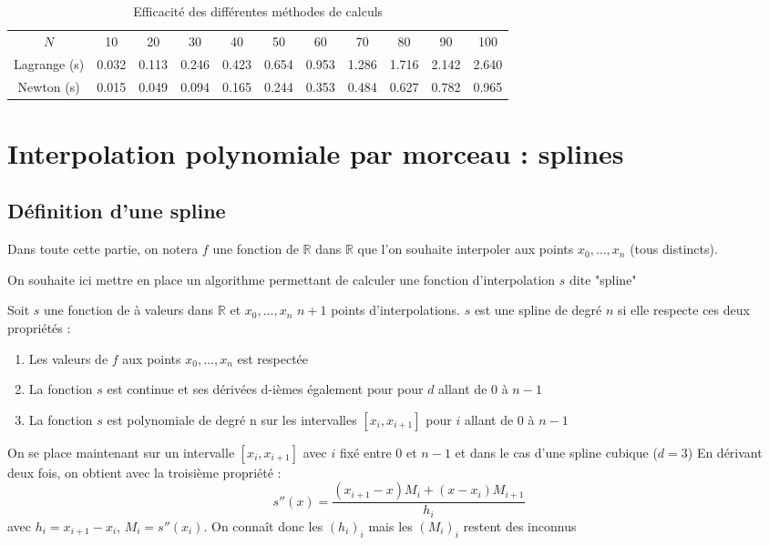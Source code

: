 \begin{table}[h]
  \centering
\begin{tabular}{ccccccccccc}
    $N$ & 10 & 20 & 30 & 40 & 50 & 60 & 70 & 80 & 90 & 100 \\
   Lagrange (s) & 0.032 & 0.113 & 0.246 & 0.423 & 0.654 & 0.953 & 1.286 & 1.716 & 2.142 & 2.640 \\
   Newton (s) & 0.015 & 0.049 & 0.094 & 0.165 & 0.244 & 0.353 & 0.484 & 0.627 & 0.782 & 0.965 \\
\end{tabular}
  \caption{Efficacité des différentes méthodes de calculs}
  \label{table:compNewtonLagrange}
\end{table}



\chapter{Interpolation polynomiale par morceau : splines}

\section{Définition d'une spline }

Dans toute cette partie, on notera $f$ une fonction de $\mathbb{R}$ 
dans $\mathbb{R}$ que l'on souhaite interpoler aux points 
$x_0, \dots, x_n$ (tous distincts).

On souhaite ici mettre en place un algorithme 
permettant de calculer une fonction d'interpolation $s$ dite "spline"

\begin{definition}
Soit $s$ une fonction de à valeurs dans $\mathbb{R}$ et 
$x_0, \dots, x_n$ $n+1$ points d'interpolations. $s$ est une spline de degré $n$ si elle respecte
ces deux propriétés :
\begin{enumerate}
\item Les valeurs de $f$ aux points $x_0, \dots, x_n$ est respectée
\item La fonction $s$ est continue et ses dérivées d-ièmes également pour pour $d$ allant de $0$ à $n-1$
\item La fonction $s$ est polynomiale de degré n sur les intervalles $[x_i,x_{i+1}]$ pour $i$ allant de $0$ à $n-1$
\end{enumerate}
\end{definition}

On se place maintenant sur un intervalle $[x_i,x_{i+1}]$ avec $i$ fixé entre 0 et $n-1$ et dans le cas d'une spline cubique ($d = 3$)
En dérivant deux fois, on obtient avec la troisième propriété :
\[
s''(x) = \frac{(x_{i+1} - x)M_i + (x - x_i)M_{i+1}}{h_i}
\]
avec $h_i = x_{i+1} - x_i$, $M_i = s''(x_i)$. On connaît donc les $(h_i)_i$ mais les $(M_i)_i$ restent des inconnus

